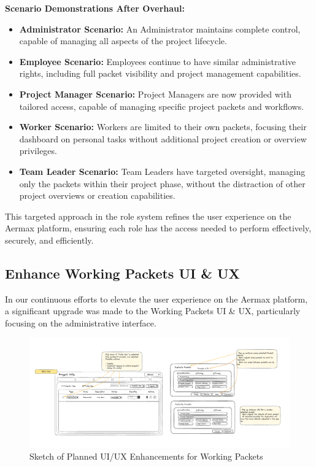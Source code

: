 \textbf{Scenario Demonstrations After Overhaul:}
\begin{itemize}
    \item \textbf{Administrator Scenario:} An Administrator maintains complete control, capable of managing all aspects of the project lifecycle.
    \item \textbf{Employee Scenario:} Employees continue to have similar administrative rights, including full packet visibility and project management capabilities.
    \item \textbf{Project Manager Scenario:} Project Managers are now provided with tailored access, capable of managing specific project packets and workflows.
    \item \textbf{Worker Scenario:} Workers are limited to their own packets, focusing their dashboard on personal tasks without additional project creation or overview privileges.
    \item \textbf{Team Leader Scenario:} Team Leaders have targeted oversight, managing only the packets within their project phase, without the distraction of other project overviews or creation capabilities.
\end{itemize}

This targeted approach in the role system refines the user experience on the Aermax platform, ensuring each role has the access needed to perform effectively, securely, and efficiently.

\subsection{Enhance Working Packets UI \& UX}
In our continuous efforts to elevate the user experience on the Aermax platform, a significant upgrade was made to the Working Packets UI \& UX, particularly focusing on the administrative interface. 

\begin{figure}[H]
    \centering
    \includegraphics[width=1.1\textwidth]{src/assets/chapters/ui_ux-enhancement.png}
    \caption{Sketch of Planned UI/UX Enhancements for Working Packets }
    \label{fig:ui_ux_enhancements}
\end{figure}


